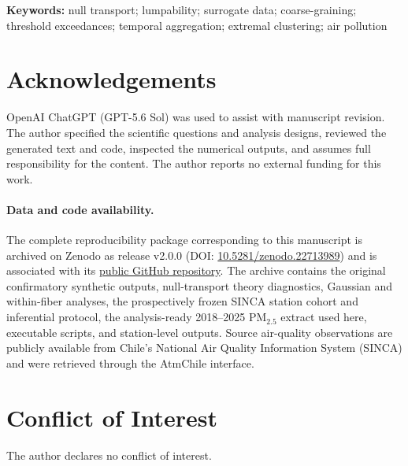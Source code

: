 \documentclass[12pt]{article}
\theoremstyle{definition}
\theoremstyle{remark}
\begin{document}
\vspace{4pt}
\noindent\textbf{Keywords:} null transport; lumpability; surrogate data; coarse-graining; threshold exceedances; temporal aggregation; extremal clustering; air pollution

\clearpage


\section*{Acknowledgements}
OpenAI ChatGPT (GPT-5.6 Sol) was used to assist with manuscript revision. The author specified the scientific questions and analysis designs, reviewed the generated text and code, inspected the numerical outputs, and assumes full responsibility for the content. The author reports no external funding for this work.

\paragraph{Data and code availability.}
The complete reproducibility package corresponding to this manuscript is archived on Zenodo as release v2.0.0 (DOI: \href{https://doi.org/10.5281/zenodo.22713989}{10.5281/zenodo.22713989}) and is associated with its \href{https://github.com/mauricio-herrera/null-placement-surrogate-inference}{public GitHub repository}. The archive contains the original confirmatory synthetic outputs, null-transport theory diagnostics, Gaussian and within-fiber analyses, the prospectively frozen SINCA station cohort and inferential protocol, the analysis-ready 2018--2025 PM$_{2.5}$ extract used here, executable scripts, and station-level outputs. Source air-quality observations are publicly available from Chile's National Air Quality Information System (SINCA) and were retrieved through the AtmChile interface.

\section*{Conflict of Interest}
The author declares no conflict of interest.


\end{document}
